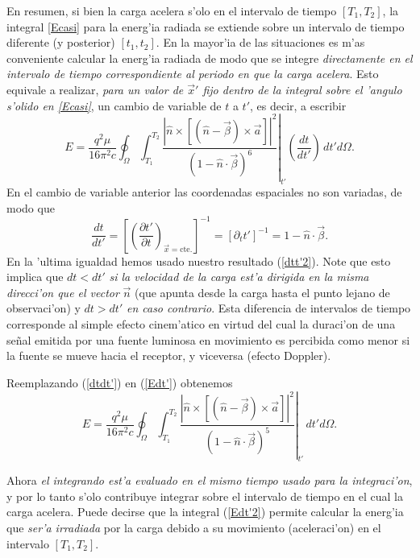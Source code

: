 En resumen, si bien la carga acelera s'olo en el intervalo de tiempo $[T_1,T_2]$, la integral \eqref{Ecasi} para la energ'ia radiada se extiende sobre un intervalo de tiempo diferente (y posterior) $[t_1,t_2]$. En la mayor'ia de las situaciones es m'as conveniente calcular la energ'ia radiada de modo que se integre \textit{directamente en el intervalo de tiempo correspondiente al periodo en que la carga acelera}. Esto equivale a realizar, \textit{para un valor de $\vec{x}'$ fijo dentro de la integral sobre el 'angulo s'olido en \eqref{Ecasi}},  un cambio de variable de $t$ a $t'$, es decir, a escribir
\begin{equation}
 E=\frac{q^2\mu}{16\pi^2 c}\oint_\Omega\int_{T_1}^{T_2}\left.\frac{\left|\hat{n}\times
\left[ \left( \hat{n}-\vec{\beta}\right)\times{\vec{a}}\right]\right|^2}{\left(
1-\hat{n}\cdot\vec{\beta}\right) ^{6}}\right|_{t'}\left(\frac{dt}{dt'}\right)\,dt'd\Omega .\label{Edt'}
\end{equation}
En el cambio de variable anterior las coordenadas espaciales no son variadas, de modo que
\begin{equation}
\frac{dt}{dt'}=\left[\left(\frac{\partial t'}{\partial t}\right)_{\vec{x}=\text{cte.}}\right]^{-1}
=\left[\partial_t t'\right]^{-1}=1-\hat{n}\cdot\vec{\beta}. \label{dtdt'}
\end{equation}
En la 'ultima igualdad hemos usado nuestro resultado (\ref{dtt'2}). Note que esto implica que $dt<dt'$ \textit{si la velocidad de la carga est'a dirigida en la misma direcci'on que el vector} $\vec{n}$ (que apunta desde la carga hasta el punto lejano de observaci'on) y $dt>dt'$ \textit{en caso contrario}. Esta diferencia de intervalos de tiempo corresponde al simple efecto cinem'atico en virtud del cual  la duraci'on de una se\~nal emitida por una fuente luminosa en movimiento es percibida como menor si la fuente se mueve hacia el receptor, y viceversa (efecto Doppler).

Reemplazando (\ref{dtdt'}) en (\ref{Edt'}) obtenemos
\begin{equation}
 E=\frac{q^2\mu}{16\pi^2 c}\oint_\Omega\int_{T_1}^{T_2}\left.\frac{\left|\hat{n}\times\left[ \left( \hat{n}-\vec{\beta}\right)\times{\vec{a}}\right]\right|^2}{\left(1-\hat{n}\cdot\vec{\beta}\right)^5}\right|_{t'}\,dt'd\Omega .\label{Edt'2}
\end{equation}

Ahora \textit{el integrando est'a evaluado en el mismo tiempo usado para la integraci'on}, y por lo tanto s'olo contribuye integrar sobre el intervalo de tiempo en el cual la carga acelera. Puede decirse que la integral (\ref{Edt'2}) permite calcular la energ'ia que \textit{ser'a irradiada} por la carga debido a su movimiento (aceleraci'on) en el intervalo $[T_1,T_2]$.

